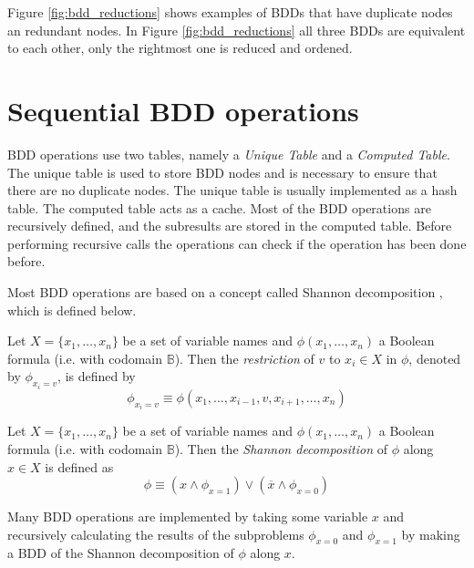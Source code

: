 Figure \ref{fig:bdd_reductions} shows examples of BDDs that have duplicate nodes an redundant nodes. In Figure \ref{fig:bdd_reductions} all three BDDs are equivalent to each other, only the rightmost one is reduced and ordened. 

\section{Sequential BDD operations}
BDD operations use two tables, namely a \emph{Unique Table} and a \emph{Computed Table}. The unique table is used to store BDD nodes and is necessary to ensure that there are no duplicate nodes. The unique table is usually implemented as a hash table. The computed table acts as a cache. Most of the BDD operations are recursively defined, and the subresults are stored in the computed table. Before performing recursive calls the operations can check if the operation has been done before.

Most BDD operations are based on a concept called Shannon decomposition \cite{dijk2012parallelization}, which is defined below.

\begin{definition}[Restriction]
	Let $X = \{ x_1, \dots, x_n \}$ be a set of variable names and $\phi(x_1, \dots, x_n)$ a Boolean formula (i.e. with codomain $\mathbb{B}$). Then the \emph{restriction} of $v$ to $x_i \in X$ in $\phi$, denoted by $\phi_{x_i=v}$, is defined by 
	\begin{equation}
		\phi_{x_i=v} \equiv \phi(x_1, \dots, x_{i - 1}, v, x_{i + 1}, \dots, x_n)
	\end{equation}
\end{definition}

\begin{definition}
	Let $X = \{ x_1, \dots, x_n \}$ be a set of variable names and $\phi(x_1, \dots, x_n)$ a Boolean formula (i.e. with codomain $\mathbb{B}$). Then the \emph{Shannon decomposition} of $\phi$ along $x \in X$ is defined as
	\begin{equation}
		\phi \equiv (x \wedge \phi_{x=1}) \vee (\overline{x} \wedge \phi_{x=0})
	\end{equation}
\end{definition}

Many BDD operations are implemented by taking some variable $x$ and recursively calculating the results of the subproblems $\phi_{x=0}$ and $\phi_{x=1}$ by making a BDD of the Shannon decomposition of $\phi$ along $x$. 


